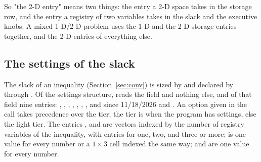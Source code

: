 So "the 2-D entry" means two things: the entry a 2-D space takes in the storage row, and the entry a registry of two variables takes in the slack and the executive knobs. A mixed 1-D/2-D problem uses the 1-D and the 2-D storage entries together, and the 2-D entries of everything else.

\subsection{The settings of the slack}\label{sec:slack-settings}

The slack of an inequality (Section~\ref{sec:conv}) is sized by  and declared by  through . Of the settings structure,  reads the field  and nothing else, and of that field nine entries: , , , , , , , and since 11/18/2026  and . An option given in the call takes precedence over the tier; the tier is  when the program has settings, else the light tier. The entries ,  and  are vectors indexed by the number of registry variables of the inequality, with entries for one, two, and three or more;  is one value for every number or a $1\times3$ cell indexed the same way;  and  are one value for every number.

